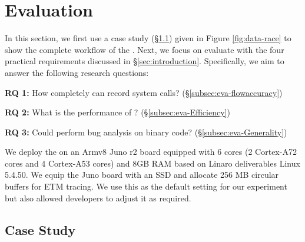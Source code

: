\section{Evaluation} \label{sec:evaluation}


In this section, we first use a case study (\S\ref{subsec:eva-casestudy}) given
in Figure \ref{fig:data-race} to show the complete workflow of the \TheName. 
Next, we focus on evaluate \TheName{} with the four practical requirements
discussed in \S\ref{sec:introduction}. Specifically, we aim
to answer the following research questions:

\vspace{1pt}
\noindent\textbf{RQ 1:} How completely can \TheName record system calls? (\S\ref{subsec:eva-flowaccuracy})

\vspace{4pt}
\noindent\textbf{RQ 2:} What is the performance of \TheName? (\S\ref{subsec:eva-Efficiency})

\vspace{4pt}
\noindent\textbf{RQ 3:} Could \TheName perform bug analysis on binary code? (\S\ref{subsec:eva-Generality})


We deploy the \TheName on an Armv8 Juno r2 board equipped with 6 cores (2
Cortex-A72 cores and 4 Cortex-A53 cores) and 8GB RAM based on Linaro
deliverables Linux 5.4.50. We equip the Juno board with an SSD and allocate
256 MB circular buffers for ETM tracing. We use this as the default setting for
our experiment but also allowed developers to adjust it as required.

\subsection{Case Study} \label{subsec:eva-casestudy}


